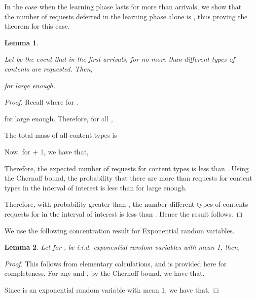 \documentclass[10pt, conference, letterpaper]{IEEEtran}
\newtheorem{lemma}{Lemma}
\begin{document}
In the case when the learning phase lasts for more than  arrivals, we show that the number of requests deferred in the learning phase alone is , thus proving the theorem for this case.

\begin{lemma}
	\label{lemma:E_1}
	
	Let  be the event that in the first  arrivals, for  no more than  different types of contents are requested. Then,
	
	for  large enough.
\end{lemma}
\begin{proof}
	Recall  where  for .
	
	for  large enough.
	Therefore, for all ,
	
	The total mass of all content types  is
	
	
	Now, for  + 1, we have that,
	
	Therefore, the expected number of requests for content types  is less than . Using the Chernoff bound, the probability that there are more than  requests for content types  in the interval of interest is less than  for  large enough.
	
	Therefore, with probability greater than , the number different types of contents requests for in the interval of interest is less than . Hence the result follows.
\end{proof}

We use the following concentration result for Exponential random variables.
\begin{lemma}
	\label{lemma:sum_of_exponentials}
	Let  for , be i.i.d. exponential random variables with mean 1, then,
	
\end{lemma}
\begin{proof}
	This follows from elementary calculations, and is provided here for completeness. For any  and , by the Chernoff bound, we have that,
	
	Since  is an exponential random variable with mean 1, we have that,
	
\end{proof}
\end{document}
